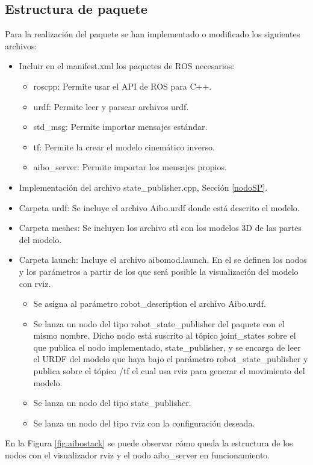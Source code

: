 \documentclass[12pt,a4paper,final,twoside]{book}
\begin{document}
\subsection{Estructura de paquete}
Para la realización del paquete se han implementado o modificado los siguientes archivos:
\begin{itemize}
\item Incluir en el manifest.xml los paquetes de ROS necesarios:
\begin{itemize}
\item roscpp: Permite usar el API de ROS para C++.
\item urdf: Permite leer y parsear archivos urdf.
\item std{\_}msg: Permite importar mensajes estándar.
\item tf: Permite la crear el modelo cinemático inverso.
\item aibo{\_}server: Permite importar los mensajes propios.  
\end{itemize}
\item Implementación del archivo state{\_}publisher.cpp, Sección \ref{nodoSP}.
\item Carpeta urdf: Se incluye el archivo Aibo.urdf donde está descrito el modelo.
\item Carpeta meshes: Se incluyen los archivo stl con los modelos 3D de las partes del modelo.
\item Carpeta launch: Incluye el archivo aibomod.launch. En el se definen los nodos y los parámetros a partir de los que será posible la visualización del modelo con rviz.
\begin{itemize}
\item Se asigna al parámetro robot{\_}description el archivo Aibo.urdf.
\item Se lanza un nodo del tipo robot{\_}state{\_}publisher del paquete con el mismo nombre. Dicho nodo está suscrito al tópico joint{\_}states sobre el que publica el nodo implementado, state{\_}publisher, y se encarga de leer el URDF del modelo que haya bajo el parámetro robot{\_}state{\_}publisher y publica sobre el tópico /tf el cual usa rviz para generar el movimiento del modelo.
\item Se lanza un nodo del tipo state{\_}publisher.
\item Se lanza un nodo del tipo rviz con la configuración deseada.
\end{itemize}
\end{itemize}

En la Figura \ref{fig:aibostack} se puede observar cómo queda la estructura de los nodos con el visualizador rviz y el nodo aibo{\_}server en funcionamiento.
\end{document}
